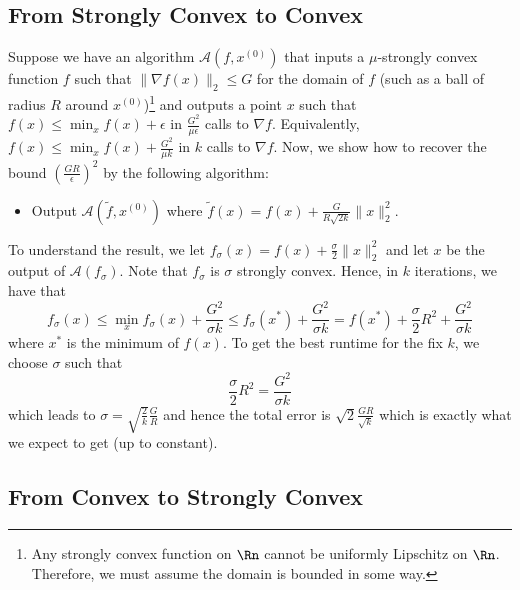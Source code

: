 \subsection*{From Strongly Convex to Convex}

Suppose we have an algorithm $\mathcal{A}(f,x^{(0)})$ that inputs
a $\mu$-strongly convex function $f$ such that $\|\nabla f(x)\|_{2}\leq G$
for the domain of $f$ (such as a ball of radius $R$ around $x^{(0)}$)\footnote{Any strongly convex function on $\Rn$ cannot be uniformly Lipschitz
on $\Rn$. Therefore, we must assume the domain is bounded in some
way.} and outputs a point $x$ such that $f(x)\leq\min_{x}f(x)+\epsilon$
in $\frac{G^{2}}{\mu\epsilon}$ calls to $\nabla f$. Equivalently,
$f(x)\leq\min_{x}f(x)+\frac{G^{2}}{\mu k}$ in $k$ calls to $\nabla f$.
Now, we show how to recover the bound $(\frac{GR}{\epsilon})^{2}$
by the following algorithm:
\begin{itemize}
\item Output $\mathcal{A}(\widetilde{f},x^{(0)})$ where $\widetilde{f}(x)=f(x)+\frac{G}{R\sqrt{2k}}\|x\|_{2}^{2}.$
\end{itemize}
To understand the result, we let $f_{\sigma}(x)=f(x)+\frac{\sigma}{2}\|x\|_{2}^{2}$
and let $x$ be the output of $\mathcal{A}(f_{\sigma})$. Note that
$f_{\sigma}$ is $\sigma$ strongly convex. Hence, in $k$ iterations,
we have that
\[
f_{\sigma}(x)\leq\min_{x}f_{\sigma}(x)+\frac{G^{2}}{\sigma k}\leq f_{\sigma}(x^{*})+\frac{G^{2}}{\sigma k}=f(x^{*})+\frac{\sigma}{2}R^{2}+\frac{G^{2}}{\sigma k}
\]
where $x^{*}$ is the minimum of $f(x)$. To get the best runtime
for the fix $k$, we choose $\sigma$ such that 
\[
\frac{\sigma}{2}R^{2}=\frac{G^{2}}{\sigma k}
\]
which leads to $\sigma=\sqrt{\frac{2}{k}}\frac{G}{R}$ and hence the
total error is $\sqrt{2}\frac{GR}{\sqrt{k}}$ which is exactly what
we expect to get (up to constant).

\subsection*{From Convex to Strongly Convex}

